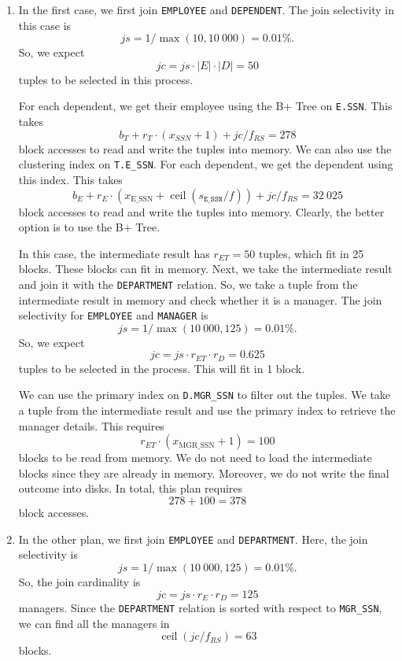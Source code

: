 \documentclass[a4paper, openany]{memoir}
\theoremstyle{definition}
\begin{document}
\begin{answer}
    \begin{enumerate}
        \item In the first case, we first join \texttt{EMPLOYEE} and \texttt{DEPENDENT}. The join selectivity in this case is
        \[\textit{js} = 1/\max(10, 10 \ 000) = 0.01\%.\]
        So, we expect
        \[\textit{jc} = \textit{js} \cdot |E| \cdot |D| = 50\]
        tuples to be selected in this process. 
        
        For each dependent, we get their employee using the B+ Tree on \texttt{E.SSN}. This takes
        \[b_T + r_T \cdot (x_{SSN} + 1) + \textit{jc}/f_{RS} = 278\]
        block accesses to read and write the tuples into memory. We can also use the clustering index on \texttt{T.E\_SSN}. For each dependent, we get the dependent using this index. This takes
        \[b_E + r_E \cdot (x_{\text{E\_SSN}} + \operatorname{ceil}(s_{\texttt{E\_SSN}} / f)) + \textit{jc}/f_{RS} = 32 \ 025\]
        block accesses to read and write the tuples into memory. Clearly, the better option is to use the B+ Tree.
        
        In this case, the intermediate result has $r_{ET} = 50$ tuples, which fit in 25 blocks. These blocks can fit in memory. Next, we take the intermediate result and join it with the \texttt{DEPARTMENT} relation. So, we take a tuple from the intermediate result in memory and check whether it is a manager. The join selectivity for \texttt{EMPLOYEE} and \texttt{MANAGER} is
        \[\textit{js} = 1/\max(10\ 000, 125) = 0.01\%.\]
        So, we expect
        \[\textit{jc} = \textit{js} \cdot r_{ET} \cdot r_D = 0.625\]
        tuples to be selected in the process. This will fit in 1 block. 
        
        We can use the primary index on \texttt{D.MGR\_SSN} to filter out the tuples. We take a tuple from the intermediate result and use the primary index to retrieve the manager details. This requires
        \[r_{ET} \cdot (x_{\text{MGR\_SSN}} + 1) = 100\]
        blocks to be read from memory. We do not need to load the intermediate blocks since they are already in memory. Moreover, we do not write the final outcome into disks. In total, this plan requires
        \[278 + 100 = 378\]
        block accesses.
        
        \item In the other plan, we first join \texttt{EMPLOYEE} and \texttt{DEPARTMENT}. Here, the join selectivity is
        \[\textit{js} = 1/\max(10 \ 000, 125) = 0.01\%.\]
        So, the join cardinality is
        \[\textit{jc} = \textit{js} \cdot r_E \cdot r_D = 125\]
        managers. Since the \texttt{DEPARTMENT} relation is sorted with respect to \texttt{MGR\_SSN}, we can find all the managers in
        \[\operatorname{ceil}(\textit{jc}/f_{RS}) = 63\]
        blocks.
        

\end{enumerate}
\end{answer}
\end{document}
